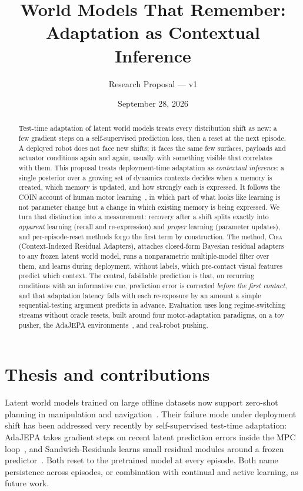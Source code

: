 \documentclass[10pt]{article}
\title{World Models That Remember:\\ Adaptation as Contextual Inference}
\author{Research Proposal --- v1}
\date{September 28, 2026}
\newcommand{\method}{\textsc{Cira}}
\begin{document}
\maketitle

\begin{abstract}
Test-time adaptation of latent world models treats every distribution shift as new: a few gradient
steps on a self-supervised prediction loss, then a reset at the next episode. A deployed robot does
not face new shifts; it faces the same few surfaces, payloads and actuator conditions again and
again, usually with something visible that correlates with them. This proposal treats deployment-time
adaptation as \emph{contextual inference}: a single posterior over a growing set of dynamics
contexts decides when a memory is created, which memory is updated, and how strongly each is
expressed. It follows the COIN account of human motor learning~\cite{heald2021coin}, in which part of
what looks like learning is not parameter change but a change in which existing memory is being
expressed. We turn that distinction into a measurement: recovery after a shift splits exactly into
\emph{apparent} learning (recall and re-expression) and \emph{proper} learning (parameter updates), and
per-episode-reset methods forgo the first term by construction. The method, \method{}
(Context-Indexed Residual Adapters), attaches closed-form Bayesian residual adapters to any frozen
latent world model, runs a nonparametric multiple-model filter over them, and learns during deployment,
without labels, which pre-contact visual features predict which context. The central, falsifiable
prediction is that, on recurring conditions with an informative cue, prediction error is corrected
\emph{before the first contact}, and that adaptation latency falls with each re-exposure by an amount a
simple sequential-testing argument predicts in advance. Evaluation uses long regime-switching streams
without oracle resets, built around four motor-adaptation paradigms, on a toy pusher, the AdaJEPA
environments~\cite{wang2026adajepa}, and real-robot pushing.
\end{abstract}

\section{Thesis and contributions}

Latent world models trained on large offline datasets now support zero-shot planning in manipulation
and navigation~\cite{zhou2025dinowm,assran2025vjepa2,sobal2025pldm,hansen2024tdmpc2}. Their
failure mode under deployment shift has been addressed very recently by self-supervised test-time
adaptation: AdaJEPA takes gradient steps on recent latent prediction errors inside the MPC
loop~\cite{wang2026adajepa}, and Sandwich-Residuals learns small residual modules around a frozen
predictor~\cite{soni2026sandwich}. Both reset to the pretrained model at every episode. Both name
persistence across episodes, or combination with continual and active learning, as future work.
\end{document}
